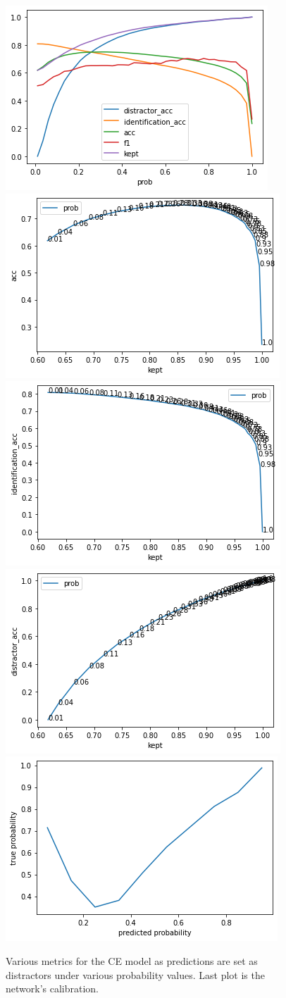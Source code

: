 \begin{figure}
    \centering
    \includegraphics[width=0.45\columnwidth]{50-files/ce-all.png}
    \includegraphics[width=0.45\columnwidth]{50-files/ce-acc-kept.png}
    \includegraphics[width=0.45\columnwidth]{50-files/ce-id-kept.png}
    \includegraphics[width=0.45\columnwidth]{50-files/ce-distr-kept.png}
    \includegraphics[width=0.45\columnwidth]{50-files/ce-calibration.png}
    \caption{Various metrics for the CE model as predictions are set as distractors under various probability values. Last plot is the network's calibration.}
    \label{fig:ce-plots}
\end{figure}

